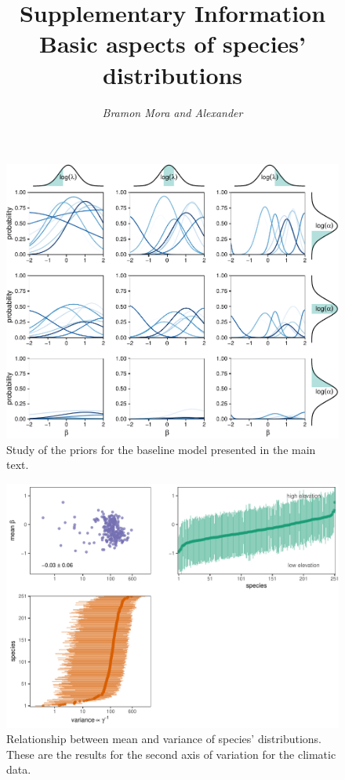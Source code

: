 \documentclass[11pt, a4paper]{article}
\title{\vspace{-1cm} \normalsize Supplementary Information\\\vspace{0.2cm}
\LARGE Basic aspects of species' distributions}
\author{\textit{Bramon Mora and Alexander}}
\date{}
\begin{document}
\maketitle
\thispagestyle{empty}

\clearpage

\begin{figure}[ht]
  \centering
    \vspace{0.5cm}
    \includegraphics[width=1\textwidth]{figures/prior}
    	  \vspace{0.3cm}
	   \caption{Study of the priors for the baseline model presented in the main text.}
      \label{sfig:sensitivity}
\end{figure}

\clearpage

\begin{figure}[h]
  \centering
    \vspace{0.5cm}
    \includegraphics[width=1\textwidth]{figures/figure1-secondaxis}
    	  \vspace{0.3cm}
	   \caption{Relationship between mean and variance of species' distributions. These are the results for the second axis of variation for the climatic data.}
      \label{sfig:sensitivity}
\end{figure}

\clearpage


\end{document}
